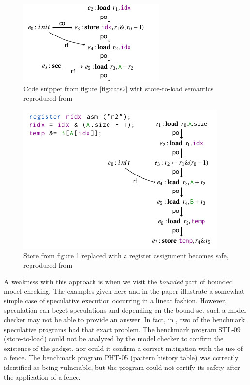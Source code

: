\documentclass[11pt,conference]{IEEEtran}
\begin{document}
\begin{figure}[t]
  \centering
  \includegraphics[width=0.6\linewidth]{cats3}
	\caption{Code snippet from figure \ref{fig:cats2} with store-to-load semantics reproduced from \cite{cats2022}}
  \label{fig:cats3}
\end{figure}

\begin{figure}[t]
  \centering
  \includegraphics[width=0.8\linewidth]{cats4}
	\caption{Store from figure \ref{fig:cats3} replaced with a register assignment becomes safe, reproduced from \cite{cats2022}}
  \label{fig:cats4}
\end{figure}


A weakness with this approach is when we visit the \emph{bounded} part of bounded model checking.
The examples given here and in the paper illustrate a somewhat simple case of speculative execution occurring in a linear fashion.
However, speculation can beget speculations and depending on the bound set such a model checker may not be able to provide an answer.
In fact, in \cite{cats2022}, two of the benchmark speculative programs had that exact problem.
The benchmark program STL-09 (store-to-load) could not be analyzed by the model checker to confirm the existence of the gadget, nor could it confirm a correct mitigation with the use of a fence.
The benchmark program PHT-05 (pattern history table) was correctly identified as being vulnerable, but the program could not certify its safety after the application of a fence.
\end{document}
